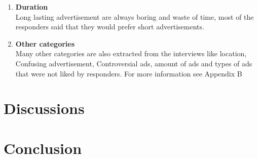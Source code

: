 \begin{enumerate}
\item \textbf{Duration} \\
Long lasting advertisement are always boring and waste of time, most of the responders said that they would prefer short advertisements.

\item \textbf{Other categories} \\
Many other categories are also extracted from the interviews like location, Confusing advertisement, Controversial ads, amount of ads and types of ads that were not liked by responders. For more information see Appendix B

\end{enumerate}


\section{Discussions}

\section{Conclusion} 


